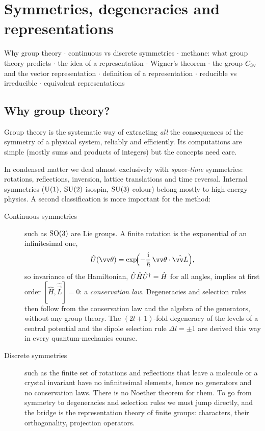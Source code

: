 \chapter{Symmetries, degeneracies and representations}\label{ch:intro}

\begin{watch}{}
Why group theory  $\cdot$
continuous vs discrete symmetries  $\cdot$
methane: what group theory predicts  $\cdot$
the idea of a representation  $\cdot$
Wigner's theorem  $\cdot$
the group $C_{3\mathrm{v}}$ and the vector representation  $\cdot$
definition of a representation  $\cdot$
reducible vs irreducible  $\cdot$
equivalent representations 
\end{watch}

\section{Why group theory?}

Group theory is the systematic way of extracting \emph{all} the consequences of the
symmetry of a physical system, reliably and efficiently. Its computations are simple
(mostly sums and products of integers) but the concepts need care.

In condensed matter we deal almost exclusively with \emph{space-time} symmetries:
rotations, reflections, inversion, lattice translations and time reversal. Internal
symmetries ($\mathrm{U}(1)$, $\mathrm{SU}(2)$ isospin, $\mathrm{SU}(3)$ colour) belong mostly to high-energy
physics. A second classification is more important for the method:

\begin{description}
\item[Continuous symmetries] such as $\mathrm{SO}(3)$ are Lie groups. A finite rotation is
the exponential of an infinitesimal one,
\begin{equation}\label{eq:rotexp}
  \hat{U}(\vec{\theta}) = \exp\!\Bigl(-\frac{\ii}{\hbar}\,\vec{\theta}\cdot\hat{\vec{L}}\Bigr),
\end{equation}
so invariance of the Hamiltonian, $\hat{U}\hat{H}\hat{U}^{\dagger}=\hat{H}$ for all
angles, implies at first order $[\hat{H},\hat{\vec{L}}]=0$: a \emph{conservation law}.
Degeneracies and selection rules then follow from the conservation law and the
algebra of the generators, without any group theory. The $(2l+1)$-fold degeneracy
of the levels of a central potential and the dipole selection rule
$\Delta l=\pm1$ are derived this way in every quantum-mechanics course.
\item[Discrete symmetries] such as the finite set of rotations and reflections that
leave a molecule or a crystal invariant have no infinitesimal elements, hence no
generators and no conservation laws. There is no Noether theorem for them.
To go from symmetry to degeneracies and selection rules we must jump directly,
and the bridge is the representation theory of finite groups: characters, their
orthogonality, projection operators.
\end{description}

